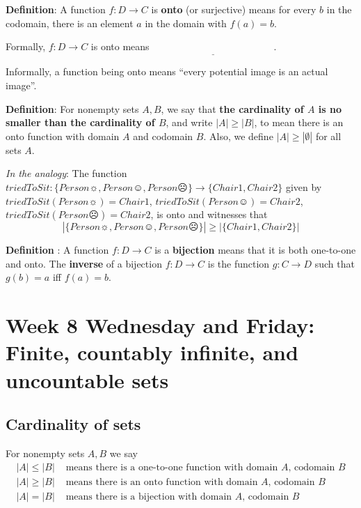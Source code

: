 \documentclass[12pt, oneside]{article}
\begin{document}
{\bf Definition}: A function $f: D  \to C$ is {\bf onto} (or  surjective) means for every $b$ in the codomain, 
there  is an element $a$ in the domain with  $f(a) = b$.

Formally, $f: D  \to  C$ is  onto  means $\underline{\phantom{\forall b \in C  \exists a \in D ( f(a) = b)}}$.
 

Informally, a function being onto means ``every potential image is an actual image''.

\phantom{Draw finite domain, finite codomain picture with duplicate image.}
\vspace{50pt} 

{\bf Definition}:  For nonempty sets $A, B$, we say that {\bf the  cardinality of $A$ is  no  smaller than 
the cardinality of  $B$}, and 
write $|A| \geq |B|$, to mean there is an onto function  with domain $A$  and codomain $B$.
Also, we define $|A| \geq |\emptyset|$ for all sets $A$.
 

{\it In the analogy}: The function $triedToSit: \{ Person\sun, Person\smiley, Person\frownie \} \to  \{ Chair1, Chair2\} $ given
by $triedToSit(Person\sun) = Chair1$,  $triedToSit(Person\smiley) = Chair2$, 
$triedToSit(Person\frownie) = Chair2$, is onto and witnesses that 
\[
 |\{ Person\sun, Person\smiley, Person\frownie \}| \geq | \{ Chair1, Chair2\} |
\] 

{\bf Definition} : A function $f: D  \to C$ is a {\bf bijection} means that it is both 
one-to-one  and onto. The {\bf inverse} of a  bijection $f: D  \to  C$ is 
the function $g: C  \to  D$  such that $g(b) = a$ iff  $f(a) =  b$.
 


\newpage

\section*{Week 8 Wednesday and Friday: Finite, countably infinite, and uncountable sets}
\subsection*{Cardinality of sets}

For nonempty sets $A, B$ we say
\begin{align*}
|A| \leq |B| &\text{ means there is a one-to-one function with domain $A$, codomain $B$} \\
|A| \geq |B| &\text{ means there is an onto function with domain $A$, codomain $B$} \\
|A| = |B| &\text{ means there is a bijection with domain $A$, codomain $B$}
\end{align*}
\end{document}
